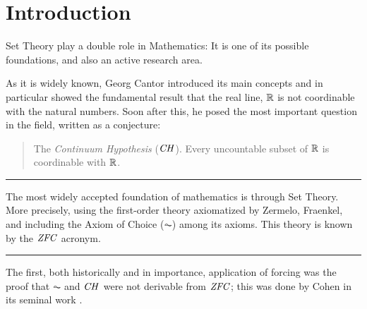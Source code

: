 \section{Introduction}\label{sec:introduction}
Set Theory play a double role in Mathematics: It is one of its
possible foundations, and also an active research area.

As it is widely known, Georg Cantor introduced its main concepts and in
particular showed the fundamental result that the real line, $\mathbb{R}$  is not
coordinable with the natural numbers. Soon after this, he posed the
most important question in the field, written as a conjecture:
\begin{quote}
  The \emph{Continuum Hypothesis} ($\mathit{CH}$). Every uncountable subset of $\mathbb{R}$ is
  coordinable with $\mathbb{R}$.
\end{quote}
\bigskip

\hrule
\bigskip


The most widely accepted foundation of mathematics is through Set
Theory. More precisely, using the first-order theory axiomatized by
Zermelo, Fraenkel, and including the Axiom of Choice ($\AC$) among its
axioms. This theory is known by the $\mathit{ZFC}$ acronym.
\bigskip

\hrule
\bigskip

The first, both historically and in importance,
    application of forcing was the proof that $\AC$ and $\mathit{CH}$ were not
    derivable from $\mathit{ZFC}$; this was done by Cohen in its seminal work \cite{Cohen-CH-PNAS}.

